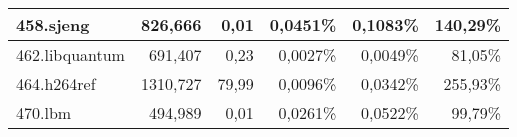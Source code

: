 \begin{table}[]
\begin{tabular}{|l|r|r|r|r|r|}
		458.sjeng          & 826,666                                                                                                                      & 0,01                                                                                                                 & 0,0451\%                                                                                                                 & 0,1083\%                                                                                                                 & 140,29\%                                                                                                                            \\ \hline
		462.libquantum     & 691,407                                                                                                                      & 0,23                                                                                                                 & 0,0027\%                                                                                                                 & 0,0049\%                                                                                                                 & 81,05\%                                                                                                                             \\ \hline
		464.h264ref        & 1310,727                                                                                                                     & 79,99                                                                                                                & 0,0096\%                                                                                                                 & 0,0342\%                                                                                                                 & 255,93\%                                                                                                                            \\ \hline
		470.lbm            & 494,989                                                                                                                      & 0,01                                                                                                                 & 0,0261\%                                                                                                                 & 0,0522\%                                                                                                                 & 99,79\%                                                                                                                             \\ \hline

\end{tabular}
\end{table}
